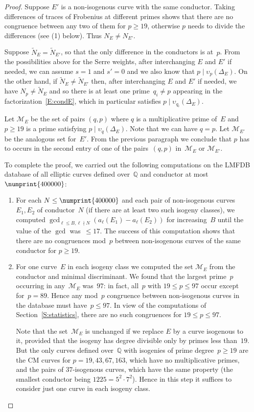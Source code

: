 \documentclass[12pt]{amsart}
\newcommand{\Q}{\mathbb{Q}}
\newcommand{\calM}{\mathcal{M}}
\newcommand{\vv}{\upsilon}
\numberwithin{equation}{section}
\theoremstyle{definition}
\theoremstyle{remark}
\begin{document}
\begin{proof}
Suppose $E'$ is a non-isogenous curve with the same conductor. Taking differences of traces of Frobenius at different primes shows that 
there are no congruence between any two of them for $p \geq 19$, otherwise $p$ needs to divide the differences (see (1) below). 
Thus $N_E \neq N_{E'}$.

Suppose $\tilde{N}_E = \tilde{N}_{E'}$, so that the only difference in the conductors is at~$p$. From the possibilities above for the Serre weights, after interchanging $E$ and $E'$ if needed, 
we can assume $s=1$ and $s'=0$ and we also know that $p \mid \vv_p(\Delta_E)$. On the other hand, if $\tilde{N}_E \neq \tilde{N}_{E'}$ then, after interchanging $E$ and $E'$ if needed, we have $N_p \neq \tilde{N}_E$ and so there is at least one prime~$q_i \neq p$ appearing in the factorization~\eqref{E:condE}, which in particular satisfies $p \mid \vv_{q_i}(\Delta_E)$.

Let $\calM_E$ be the set of pairs $(q,p)$ where $q$ is a multiplicative prime of~$E$ and
$p \geq 19$ is a prime satisfying $p \mid \vv_{q}(\Delta_E)$.
Note that we can have $q=p$. Let $\calM_{E'}$ be the analogous set for~$E'$. From the previous paragraph we conclude that 
$p$ has to occurs in the second entry of one of the pairs~$(q,p)$ in~$\calM_E$ or $\calM_{E'}$.

To complete the proof, we carried out the following computations on
the LMFDB database of all elliptic curves defined over~$\Q$ and
conductor at most~$\numprint{400000}$:
\begin{enumerate}
\item For each $N\le \numprint{400000}$ and each pair of non-isogenous
  curves~$E_1,E_2$ of conductor~$N$ (if there are at least two such
  isogeny classes), we computed $\gcd_{\ell\le B,
    \ell\nmid N}(a_{\ell}(E_1)-a_{\ell}(E_2))$ for increasing~$B$
  until the value of the $\gcd$ was~${}\le17$.  The success of this
  computation shows that there are no congruences mod~$p$ between
  non-isogenous curves of the same conductor for $p\ge19$.
\item For one curve~$E$ in each isogeny class we computed the set
  $\calM_E$ from the conductor and minimal discriminant.  We found that
  the largest prime~$p$ occurring in any~$\calM_E$ was~$97$: in fact,
  all~$p$ with $19\le p\le97$ occur except for~$p=89$.  Hence any
  mod~$p$ congruence between non-isogenous curves in the database must
  have~$p\le97$.  In view of the computations of
  Section~\ref{S:statistics}, there are no such congruences for $19\le
  p\le97$.

  Note that the set~$\calM_E$ is unchanged if we replace $E$ by a curve
  isogenous to it, provided that the isogeny has degree divisible only
  by primes less than~$19$.  But the only curves defined over~$\Q$ with
  isogenies of prime degree~$p\ge19$ are the CM curves for
  $p=19,43,67,163$, which have no multiplicative primes, and the pairs
  of $37$-isogenous curves, which have the same property (the smallest
  conductor being $1225=5^2\cdot7^2$).  Hence in this step it suffices
  to consider just one curve in each isogeny class.
\end{enumerate}
\end{proof}
\end{document}
